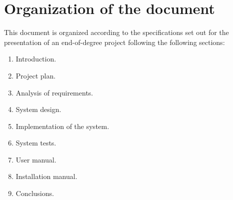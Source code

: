 \section{Organization of the document}
This document is organized according to the specifications set out for the presentation of an end-of-degree project following the following sections:
\begin{enumerate}
	\item Introduction.
	\item Project plan.
	\item Analysis of requirements.
	\item System design.
	\item Implementation of the system.
	\item System tests.
	\item User manual.
	\item Installation manual.
	\item Conclusions.
\end{enumerate}
